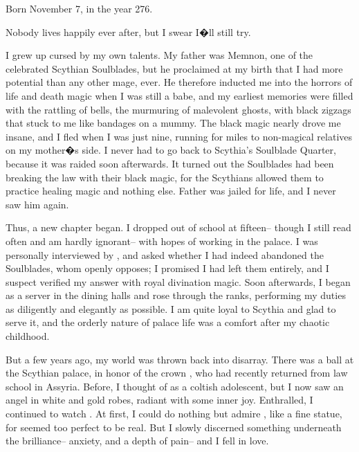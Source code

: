 \documentclass[char]{Kos}
\begin{document}
\name{\cButler{}}

Born November 7, in the year 276.

Nobody lives happily ever after, but I swear I�ll still try.

I grew up cursed by my own talents. My father was Memnon, one of the celebrated Scythian Soulblades, but he proclaimed at my birth that I had more potential than any other mage, ever. He therefore inducted me into the horrors of life and death magic when I was still a babe, and my earliest memories were filled with the rattling of bells, the murmuring of malevolent ghosts, with black zigzags that stuck to me like bandages on a mummy. The black magic nearly drove me insane, and I fled when I was just nine, running for miles to non-magical relatives on my mother�s side. I never had to go back to Scythia's Soulblade Quarter, because it was raided soon afterwards. It turned out the Soulblades had been breaking the law with their black magic, for the Scythians allowed them to practice healing magic and nothing else. Father was jailed for life, and I never saw him again.

Thus, a new chapter began. I dropped out of school at fifteen-- though I still read often and am hardly ignorant-- with hopes of working in the palace. I was personally interviewed by\cScythiaQueen{\Monarch} \cScythiaQueen{\nickname}, and \cScythiaQueen{\they} asked whether I had indeed abandoned the Soulblades, whom \cScythiaQueen{\they} openly opposes; I promised I had left them entirely, and I suspect \cScythiaQueen{\they} verified my answer with royal divination magic. Soon afterwards, I began as a server in the dining halls and rose through the ranks, performing my duties as diligently and elegantly as possible. I am quite loyal to Scythia and glad to serve it, and the orderly nature of palace life was a comfort after my chaotic childhood.

But a few years ago, my world was thrown back into disarray. There was a ball at the Scythian palace, in honor of the crown \cBride{\prince} \cBride{\nickname}, who had recently returned from law school in Assyria. Before, I thought of \cBride{\them} as a coltish adolescent, but I now saw an angel in white and gold robes, radiant with some inner joy. Enthralled, I continued to watch \cBride{\them}. At first, I could do nothing but admire \cBride{\them}, like a fine statue, for \cBride{\they} seemed too perfect to be real. But I slowly discerned something underneath the brilliance-- anxiety, and a depth of pain-- and I fell in love. 
\end{document}
